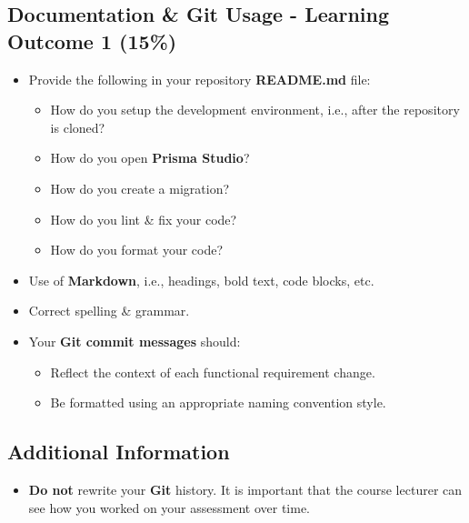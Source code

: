 \documentclass{article}
\begin{document}
\subsection*{Documentation \& Git Usage - Learning Outcome 1 (15\%)}
\begin{itemize}
    \item Provide the following in your repository \textbf{README.md} file:
    \begin{itemize} 
      \item How do you setup the development environment, i.e., after the repository is cloned?
	  \item How do you open \textbf{Prisma Studio}?
	  \item How do you create a migration? 
	  \item How do you lint \& fix your code?
      \item How do you format your code?
    \end{itemize}
    \item Use of \textbf{Markdown}, i.e., headings, bold text, code blocks, etc.
    \item Correct spelling \& grammar.
    \item Your \textbf{Git commit messages} should:
    \begin{itemize}
      \item Reflect the context of each functional requirement change.
      \item Be formatted using an appropriate naming convention style.
    \end{itemize}	
\end{itemize}

\subsection*{Additional Information}
\begin{itemize}
    \item \textbf{Do not} rewrite your \textbf{Git} history. It is important that the course lecturer can see how you worked on your assessment over time. 
\end{itemize} 
\end{document}
